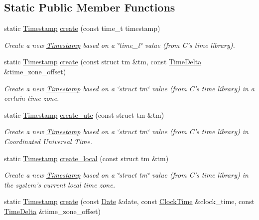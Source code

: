 \subsection*{Static Public Member Functions}
\begin{DoxyCompactItemize}
\item 
static \hyperlink{structTimestamp}{Timestamp} \hyperlink{structTimestamp_a050609c408bf55dafa24a080757a471b}{create} (const time\-\_\-t timestamp)
\begin{DoxyCompactList}\small\item\em Create a new \hyperlink{structTimestamp}{Timestamp} based on a \char`\"{}time\-\_\-t\char`\"{} value (from C's time library). \end{DoxyCompactList}\item 
static \hyperlink{structTimestamp}{Timestamp} \hyperlink{structTimestamp_a33f19b24e53fb06f9ea0285f7ed495aa}{create} (const struct tm \&tm, const \hyperlink{structTimeDelta}{Time\-Delta} \&time\-\_\-zone\-\_\-offset)
\begin{DoxyCompactList}\small\item\em Create a new \hyperlink{structTimestamp}{Timestamp} based on a \char`\"{}struct tm\char`\"{} value (from C's time library) in a certain time zone. \end{DoxyCompactList}\item 
static \hyperlink{structTimestamp}{Timestamp} \hyperlink{structTimestamp_ae1ec817a76d5f43941548b9cccf3bdeb}{create\-\_\-utc} (const struct tm \&tm)
\begin{DoxyCompactList}\small\item\em Create a new \hyperlink{structTimestamp}{Timestamp} based on a \char`\"{}struct tm\char`\"{} value (from C's time library) in Coordinated Universal Time. \end{DoxyCompactList}\item 
static \hyperlink{structTimestamp}{Timestamp} \hyperlink{structTimestamp_ae2d7fea77bd2f2c7ca3343be080dd90f}{create\-\_\-local} (const struct tm \&tm)
\begin{DoxyCompactList}\small\item\em Create a new \hyperlink{structTimestamp}{Timestamp} based on a \char`\"{}struct tm\char`\"{} value (from C's time library) in the system's current local time zone. \end{DoxyCompactList}\item 
static \hyperlink{structTimestamp}{Timestamp} \hyperlink{structTimestamp_a007e724059ba1b14d68579e6b4a30d86}{create} (const \hyperlink{structDate}{Date} \&date, const \hyperlink{structClockTime}{Clock\-Time} \&clock\-\_\-time, const \hyperlink{structTimeDelta}{Time\-Delta} \&time\-\_\-zone\-\_\-offset)

\end{DoxyCompactItemize}
